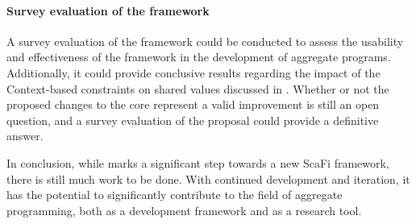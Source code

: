 \paragraph{Survey evaluation of the framework} A survey evaluation of the framework could be conducted to assess the usability and effectiveness of the framework in the development of aggregate programs.
%
Additionally, it could provide conclusive results regarding the impact of the Context-based constraints on shared values discussed in .
%
Whether or not the proposed changes to the core represent a valid improvement is still an open question, and a survey evaluation of the proposal could provide a definitive answer.

In conclusion, while \this marks a significant step towards a new ScaFi framework, there is still much work to be done.
%
With continued development and iteration, it has the potential to significantly contribute to the field of aggregate programming, both as a development framework and as a research tool.
